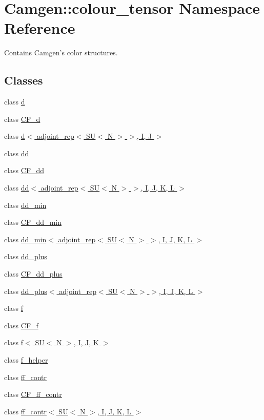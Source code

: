 \hypertarget{a00851}{\section{Camgen\-:\-:colour\-\_\-tensor Namespace Reference}
\label{a00851}
}


Contains Camgen's color structures.  


\subsection*{Classes}
\begin{DoxyCompactItemize}
\item 
class \hyperlink{a00114}{d}
\item 
class \hyperlink{a00034}{C\-F\-\_\-d}
\item 
class \hyperlink{a00115}{d$<$ adjoint\-\_\-rep$<$ S\-U$<$ N $>$ $>$, I, J $>$}
\item 
class \hyperlink{a00119}{dd}
\item 
class \hyperlink{a00035}{C\-F\-\_\-dd}
\item 
class \hyperlink{a00120}{dd$<$ adjoint\-\_\-rep$<$ S\-U$<$ N $>$ $>$, I, J, K, L $>$}
\item 
class \hyperlink{a00121}{dd\-\_\-min}
\item 
class \hyperlink{a00036}{C\-F\-\_\-dd\-\_\-min}
\item 
class \hyperlink{a00122}{dd\-\_\-min$<$ adjoint\-\_\-rep$<$ S\-U$<$ N $>$ $>$, I, J, K, L $>$}
\item 
class \hyperlink{a00123}{dd\-\_\-plus}
\item 
class \hyperlink{a00037}{C\-F\-\_\-dd\-\_\-plus}
\item 
class \hyperlink{a00124}{dd\-\_\-plus$<$ adjoint\-\_\-rep$<$ S\-U$<$ N $>$ $>$, I, J, K, L $>$}
\item 
class \hyperlink{a00213}{f}
\item 
class \hyperlink{a00038}{C\-F\-\_\-f}
\item 
class \hyperlink{a00214}{f$<$ S\-U$<$ N $>$, I, J, K $>$}
\item 
class \hyperlink{a00215}{f\-\_\-helper}
\item 
class \hyperlink{a00222}{ff\-\_\-contr}
\item 
class \hyperlink{a00039}{C\-F\-\_\-ff\-\_\-contr}
\item 
class \hyperlink{a00223}{ff\-\_\-contr$<$ S\-U$<$ N $>$, I, J, K, L $>$}
\item 

\end{DoxyCompactItemize}
